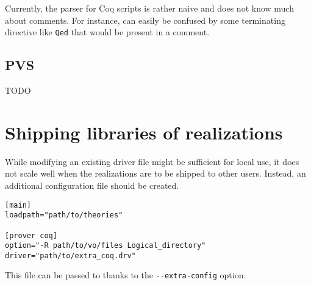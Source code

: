 Currently, the parser for Coq scripts is rather naive and does not know
much about comments. For instance, \why can easily be confused by
some terminating directive like \verb+Qed+ that would be present in a
comment.

\subsection{PVS}

TODO

\section{Shipping libraries of realizations}

While modifying an existing driver file might be sufficient for local
use, it does not scale well when the realizations are to be shipped to
other users. Instead, an additional configuration file should be created.

\begin{verbatim}
[main]
loadpath="path/to/theories"

[prover coq]
option="-R path/to/vo/files Logical_directory"
driver="path/to/extra_coq.drv"
\end{verbatim}

This file can be passed to \why thanks to the \verb+--extra-config+
option.
